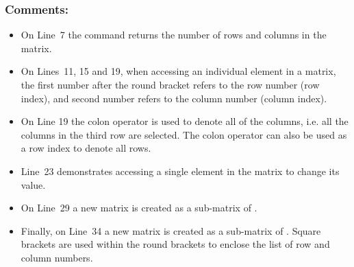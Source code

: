 \subsubsection{Comments:}
\begin{itemize}
\item On Line~7 the  command returns the number of rows and columns in the matrix. 
\item On Lines~11, 15 and 19, when accessing an individual element in a matrix, the first number after the round bracket refers to the row number (row index), and second number refers to the column number (column index).
\item On Line 19 the colon operator is used to denote all of the columns, i.e. all the columns in the third row are selected. The colon operator can also be used as a row index to denote all rows.
\item Line~23 demonstrates accessing a single element in the matrix  to change its value.
\item On Line~29 a new matrix  is created as a sub-matrix of .
\item Finally, on Line~34 a new matrix  is created as a sub-matrix of . Square brackets are used within the round brackets to enclose the list of row and column numbers.
\end{itemize}

